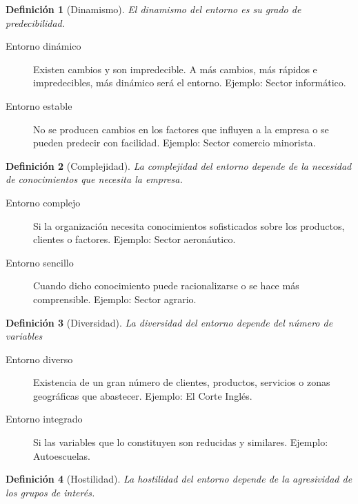 \documentclass[12pt]{article}
\theoremstyle{definition_wo_parentheses}
\newtheorem{definicion}{Definición}[section]
\begin{document}
\begin{definicion}[Dinamismo]
El dinamismo del entorno es su grado de predecibilidad.
\end{definicion}

\begin{description}
\item[Entorno dinámico] Existen cambios y son impredecible. A más cambios, más rápidos e impredecibles, más dinámico será el entorno. Ejemplo: Sector informático.
\item[Entorno estable] No se producen cambios en los factores que influyen a la empresa o se pueden predecir con facilidad. Ejemplo: Sector comercio minorista.
\end{description}

\begin{definicion}[Complejidad]
La complejidad del entorno depende de la necesidad de conocimientos que necesita la empresa.
\end{definicion}

\begin{description}
\item[Entorno complejo]Si la organización necesita conocimientos sofisticados sobre los productos, clientes o factores. Ejemplo: Sector aeronáutico.
\item[Entorno sencillo] Cuando dicho conocimiento puede racionalizarse o se hace más comprensible. Ejemplo: Sector agrario.
\end{description}



\begin{definicion}[Diversidad]
La diversidad del entorno depende del número de variables
\end{definicion}

\begin{description}
\item[Entorno diverso] Existencia de un gran número de clientes, productos, servicios o zonas geográficas que abastecer. Ejemplo: El Corte Inglés.
\item[Entorno integrado] Si las variables que lo constituyen son reducidas y similares. Ejemplo: Autoescuelas.
\end{description}



\begin{definicion}[Hostilidad]
La hostilidad del entorno depende de la agresividad de los grupos de interés.
\end{definicion}
\end{document}
